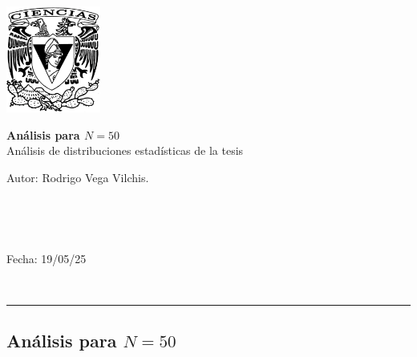 \documentclass[a4paper,11pt]{book}
\theoremstyle{plain}
\theoremstyle{definition}
\begin{document}
	\thispagestyle{empty}
	\includegraphics[height=3.5cm]{escudoCiencias.pdf}
	\vspace{-3.8cm}
	\begin{flushright}
		\hspace{4cm}
		{\Large\textbf{Análisis para $N=50$}\\
			Análisis de distribuciones estadísticas de la tesis}
		\vspace{0.3cm}\\
		\begin{large}Autor: Rodrigo Vega Vilchis.\end{large}\\
		\begin{footnotesize}
			\\
		\end{footnotesize}
		\vspace{0.1cm}
		\begin{large} 
			Fecha: 19/05/25\end{large}\\
	\end{flushright}
	\vspace{.4cm}
	\hrule height1pt\vspace{.5cm}
	
\subsection{Análisis para $N=50$}
\end{document}
